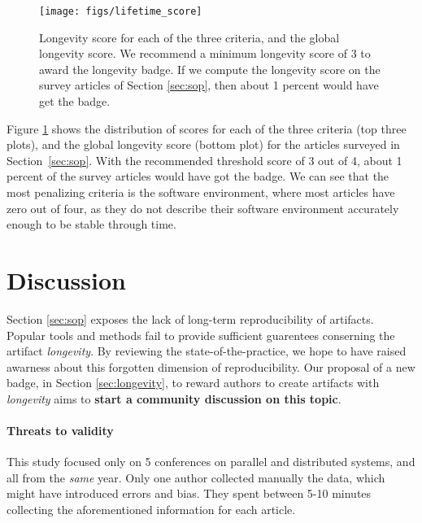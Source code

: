 \documentclass[sigconf,natbib=false]{acmart}
\newcommand{\todo}[1]{{\color{red}{TODO: #1}}}
\begin{document}
\begin{figure}
  \centering
    \texttt{[image: figs/lifetime\_score]}
  \caption{Longevity score for each of the three criteria, and the global longevity score.
  We recommend a minimum longevity score of 3 to award the longevity badge.
  If we compute the longevity score on the survey articles of Section \ref{sec:sop}, then about 1 percent would have get the badge.}\label{fig:longevity_score}
\end{figure}

Figure \ref{fig:longevity_score} shows the distribution of scores for each of the three criteria (top three plots), and the global longevity score (bottom plot) for the articles surveyed in Section\ \ref{sec:sop}.
With the recommended threshold score of 3 out of 4, about 1 percent of the survey articles would have got the badge.
We can see that the most penalizing criteria is the software environment, where most articles have zero out of four, as they do not describe their software environment accurately enough to be stable through time.


\section{Discussion}\label{sec:discussion}

Section \ref{sec:sop} exposes the lack of long-term reproducibility of artifacts.
Popular tools and methods fail to provide sufficient guarentees conserning the artifact \emph{longevity}.
By reviewing the state-of-the-practice, we hope to have raised awarness about this forgotten dimension of reproducibility.
Our proposal of a new badge, in Section \ref{sec:longevity}, to reward authors to create artifacts with \emph{longevity} aims to \textbf{start a community discussion on this topic}.


\paragraph{Threats to validity}

This study focused only on 5 conferences on parallel and distributed systems, and all from the \emph{same} year.
Only one author collected manually the data, which might have introduced errors and bias.
They spent between 5-10 minutes collecting the aforementioned information for each article.
\end{document}
